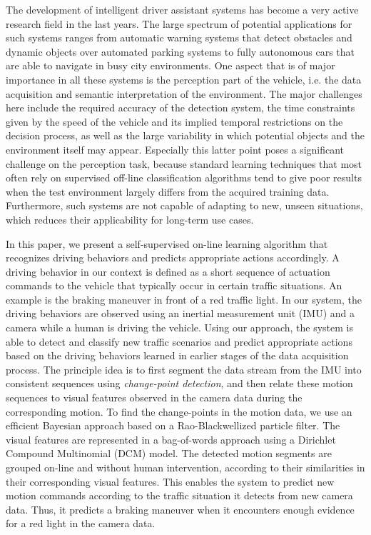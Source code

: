 The development of intelligent driver assistant systems has become a
very active research field in the last years. The large spectrum of
potential applications for such systems ranges from automatic warning
systems that detect obstacles and dynamic objects over automated
parking systems to fully autonomous cars that are able to navigate in
busy city environments. One aspect that is of major importance in all
these systems is the perception part of the vehicle, i.e. the data
acquisition and semantic interpretation of the environment. The major
challenges here include the required accuracy of the detection system,
the time constraints given by the speed of the vehicle and its implied
temporal restrictions on the decision process, as well as the large
variability in which potential objects and the environment itself may
appear. Especially this latter point poses a significant challenge on
the perception task, because standard learning techniques that most
often rely on supervised off-line classification algorithms tend to
give poor results when the test environment largely differs from the
acquired training data. Furthermore, such systems are not capable of
adapting to new, unseen situations, which reduces their applicability
for long-term use cases. 

In this paper, we present a self-supervised on-line learning algorithm
that recognizes driving behaviors and predicts appropriate actions
accordingly. A driving behavior in our context is defined as a short
sequence of actuation commands to the vehicle that typically occur in
certain traffic situations. An example is the braking maneuver in
front of a red traffic light. In our system, the driving behaviors are
observed using an inertial measurement unit (IMU) and a camera while a
human is driving the vehicle. Using our approach, the system is able
to detect and classify new traffic scenarios and predict appropriate
actions based on the driving behaviors learned in earlier stages of
the data acquisition process. The principle idea is to first segment
the data stream from the IMU into consistent sequences using
\emph{change-point detection}, and then relate these motion sequences
to visual features observed in the camera data during the
corresponding motion. To find the change-points in the motion data, we
use an efficient Bayesian approach based on a Rao-Blackwellized
particle filter. The visual features are represented in a bag-of-words
approach using a Dirichlet Compound Multinomial (DCM) model. The
detected motion segments are grouped on-line and without human
intervention, according to their similarities in their corresponding
visual features. This enables the system to predict new motion
commands according to the traffic situation it detects from new camera
data. Thus, it predicts a braking maneuver when it encounters enough
evidence for a red light in the camera data.


